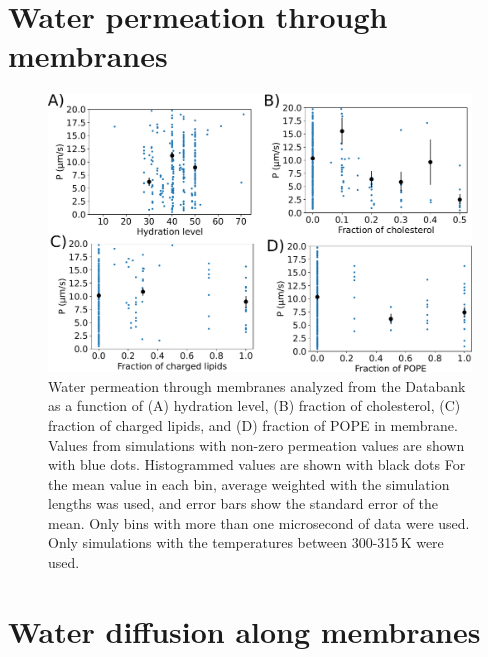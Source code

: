 \documentclass[fleqn,10pt]{wlscirepSI}
\begin{document}
\pagebreak
\section*{Water permeation through membranes}

\begin{figure}[!h]
    \centering
    \includegraphics[width = \textwidth]{Figures/permeationSI.pdf}
    \caption{Water permeation through membranes analyzed from the Databank as a function of (A) hydration level, (B) fraction of cholesterol, (C) fraction of charged lipids, and (D) fraction of POPE in membrane. Values from simulations with non-zero permeation values are shown with blue dots. Histogrammed values are shown with black dots For the mean value in each bin, average weighted with the simulation lengths was used, and error bars show the standard error of the mean. Only bins with more than one microsecond of data were used. Only simulations with the temperatures between 300-315\,K were used.
    }
    \label{fig:permeationSI}
\end{figure}

\pagebreak
\section*{Water diffusion along membranes}
\end{document}
